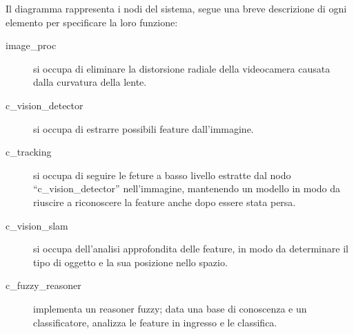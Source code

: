 Il diagramma rappresenta i nodi del sistema, segue una breve descrizione di ogni elemento per specificare la loro funzione:

\begin{description}
  \item [image\_proc] si occupa di eliminare la distorsione radiale della videocamera causata dalla curvatura della lente.
  \item [c\_vision\_detector] si occupa di estrarre possibili feature dall'immagine.
  \item [c\_tracking] si occupa di seguire le feture a basso livello estratte dal nodo ``c\_vision\_detector'' nell'immagine, mantenendo un modello in modo da riuscire a riconoscere la feature anche dopo essere stata persa. 
  \item [c\_vision\_slam] si occupa dell'analisi approfondita delle feature, in modo da determinare il tipo di oggetto e la sua posizione nello spazio. 
  \item [c\_fuzzy\_reasoner] implementa un reasoner fuzzy; data una base di conoscenza e un classificatore, analizza le feature in ingresso e le classifica. 
\end{description}



